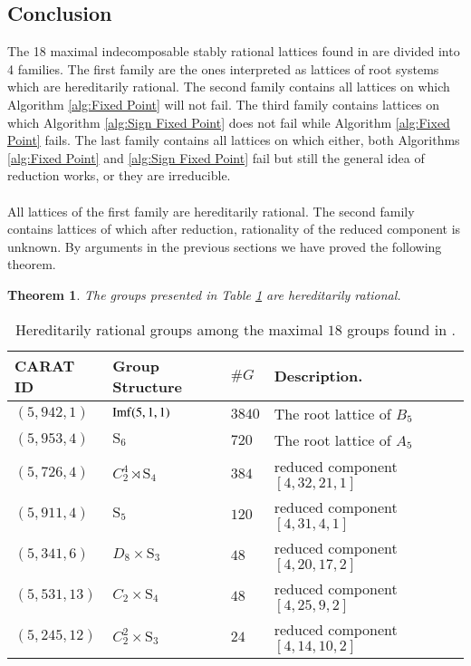 \documentclass{article}
\theoremstyle{plain}
\newtheorem{theorem}{Theorem}
\theoremstyle{definition}
\begin{document}
\subsection{Conclusion}\label{conc}
The 18 maximal indecomposable stably rational lattices found in \cite{Hoshi} are divided into 4 families. The first family are the ones interpreted as lattices of root systems which are hereditarily rational. The second family contains all lattices on which Algorithm \ref{alg:Fixed Point} will not fail. The third family contains lattices on which  Algorithm \ref{alg:Sign Fixed Point} does not fail while Algorithm \ref{alg:Fixed Point} fails. The last family contains all lattices on which either, both Algorithms \ref{alg:Fixed Point} and \ref{alg:Sign Fixed Point} fail but still the general idea of reduction works, or they are irreducible.\\
\\
All lattices of the first family are hereditarily rational. The second family contains lattices of which after reduction, rationality of the reduced component is unknown. By arguments in the previous sections we have proved the following theorem.
\begin{theorem}
The groups presented in Table \ref{Tbl:Rational} are hereditarily rational.
\end{theorem}
 \begin{table}[H]  
\centering
\begin{tabular}{lllll}
CARAT ID & Group Structure & $\#G$ & Description.\\\hline
$(5,942,1)$ & ${\rm Imf}(5,1,1)$ & $3840$ & The root lattice of $B_5$ \\
 $(5,953,4)$ & $\mathrm{S}_6$ & $720$ &  The root lattice of $A_5$ \\
 $(5,726,4)$ & $C_2^4\rtimes \mathrm{S}_4$ & $384$   & reduced component $[4,32,21,1]$  \\
$(5,911,4)$ & $\mathrm{S}_5$ & $120$  & reduced component $[ 4, 31, 4, 1 ]$  \\
 $(5,341,6)$ & $D_8\times \mathrm{S}_3$ & $48$  & reduced component $[ 4, 20, 17, 2 ]$ &\\
 $(5,531,13)$ & $C_2\times \mathrm{S}_4$ & $48$  & reduced component $[ 4, 25, 9, 2 ]$ &\\
 $(5,245,12)$ & $C_2^2\times \mathrm{S}_3$ & $24$ &reduced component $[ 4, 14, 10, 2 ]$&
\end{tabular}
\caption{Hereditarily rational groups among the maximal $18$ groups 
found in \cite{Hoshi}.}
\label{Tbl:Rational}
\end{table}
\end{document}
